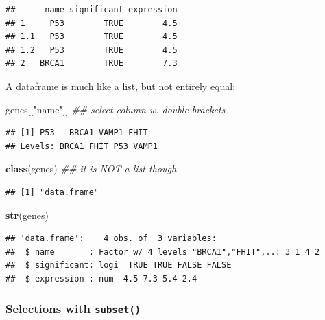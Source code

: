 \documentclass[]{book}
\newenvironment{Shaded}{\begin{snugshade}}{\end{snugshade}}
\newcommand{\CommentTok}[1]{\textcolor[rgb]{0.56,0.35,0.01}{\textit{#1}}}
\newcommand{\KeywordTok}[1]{\textcolor[rgb]{0.13,0.29,0.53}{\textbf{#1}}}
\newcommand{\NormalTok}[1]{#1}
\newcommand{\StringTok}[1]{\textcolor[rgb]{0.31,0.60,0.02}{#1}}
\begin{document}
\begin{verbatim}
##      name significant expression
## 1     P53        TRUE        4.5
## 1.1   P53        TRUE        4.5
## 1.2   P53        TRUE        4.5
## 2   BRCA1        TRUE        7.3
\end{verbatim}

A dataframe is much like a list, but not entirely equal:

\begin{Shaded}
\begin{Highlighting}[]
\NormalTok{genes[[}\StringTok{"name"}\NormalTok{]] }\CommentTok{## select column w. double brackets}
\end{Highlighting}
\end{Shaded}

\begin{verbatim}
## [1] P53   BRCA1 VAMP1 FHIT 
## Levels: BRCA1 FHIT P53 VAMP1
\end{verbatim}

\begin{Shaded}
\begin{Highlighting}[]
\KeywordTok{class}\NormalTok{(genes) }\CommentTok{## it is NOT a list though}
\end{Highlighting}
\end{Shaded}

\begin{verbatim}
## [1] "data.frame"
\end{verbatim}

\begin{Shaded}
\begin{Highlighting}[]
\KeywordTok{str}\NormalTok{(genes)}
\end{Highlighting}
\end{Shaded}

\begin{verbatim}
## 'data.frame':    4 obs. of  3 variables:
##  $ name       : Factor w/ 4 levels "BRCA1","FHIT",..: 3 1 4 2
##  $ significant: logi  TRUE TRUE FALSE FALSE
##  $ expression : num  4.5 7.3 5.4 2.4
\end{verbatim}

\hypertarget{selections-with-subset}{%
\subsubsection*{\texorpdfstring{Selections with \texttt{subset()}}{Selections with subset()}}\label{selections-with-subset}}
\end{document}
